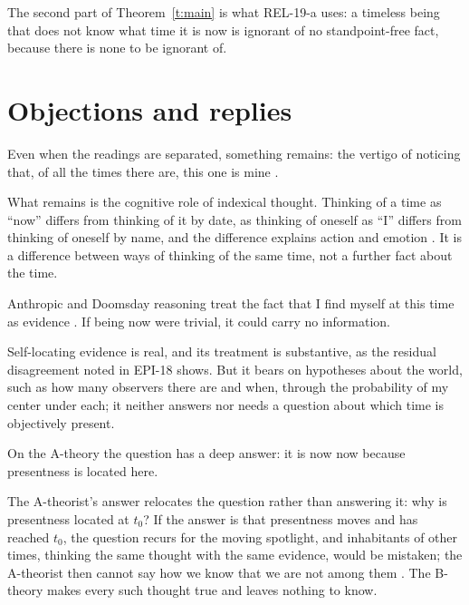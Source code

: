 \documentclass{situationist-preprint}
\begin{document}
The second part of Theorem~\ref{t:main} is what REL-19-a uses: a timeless being that does not know what time it is now is ignorant of no standpoint-free fact, because there is none to be ignorant of.

\section{Objections and replies}

\begin{objection}\label{o:residue}
Even when the readings are separated, something remains: the vertigo of noticing that, of all the times there are, this one is mine \citep{Nagel1986}.
\end{objection}

\begin{reply}
What remains is the cognitive role of indexical thought. Thinking of a time as \enquote{now} differs from thinking of it by date, as thinking of oneself as \enquote{I} differs from thinking of oneself by name, and the difference explains action and emotion \citep{Perry1979}. It is a difference between ways of thinking of the same time, not a further fact about the time.
\end{reply}

\begin{objection}\label{o:evid}
Anthropic and Doomsday reasoning treat the fact that I find myself at this time as evidence \citep{Bostrom2002}. If being now were trivial, it could carry no information.
\end{objection}

\begin{reply}
Self-locating evidence is real, and its treatment is substantive, as the residual disagreement noted in EPI-18 shows. But it bears on hypotheses about the world, such as how many observers there are and when, through the probability of my center under each; it neither answers nor needs a question about which time is objectively present.
\end{reply}

\begin{objection}\label{o:atheory}
On the A-theory the question has a deep answer: it is now now because presentness is located here.
\end{objection}

\begin{reply}
The A-theorist's answer relocates the question rather than answering it: why is presentness located at $t_0$? If the answer is that presentness moves and has reached $t_0$, the question recurs for the moving spotlight, and inhabitants of other times, thinking the same thought with the same evidence, would be mistaken; the A-theorist then cannot say how we know that we are not among them \citep{BraddonMitchell2004}. The B-theory makes every such thought true and leaves nothing to know.
\end{reply}
\end{document}
